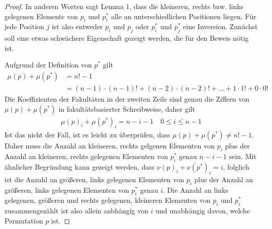 \documentclass[a4paper, 10pt, ngerman]{article}
\begin{document}
\begin{proof}
    In anderen Worten sagt Lemma 1, dass die kleineren, rechts bzw. links gelegenen Elemente von $p_i$ und $p^*_i$ alle an unterschiedlichen Positionen liegen. Für jede Position $j$ ist also entweder $p_i$ und $p_j$ oder $p^*_i$ und $p^*_j$ eine Inversion. Zunächst soll eine etwas schwächere Eigenschaft gezeigt werden, die für den Beweis nötig ist.

    Aufgrund der Definition von $p^*$ gilt
    \begin{align*}
        \mu(p) + \mu(p^*) & = n! - 1                                                                           \\
                          & =(n - 1) \cdot (n - 1)! + (n - 2) \cdot (n - 2)! + \dots + 1 \cdot 1! + 0 \cdot 0!
    \end{align*}
    Die Koeffizienten der Fakultäten in der zweiten Zeile sind genau die Ziffern von $\mu(p) + \mu(p^*)$ in fakultätsbasierter Schreibweise, daher gilt
    \begin{align*}
        \mu(p)_i + \mu(p^*)_i = n - i - 1 \quad 0 \le i \le n - 1
    \end{align*}
    Ist das nicht der Fall, ist es leicht zu überprüfen, dass $\mu(p) + \mu(p^*) \ne n! - 1$. Daher muss die Anzahl an kleineren, rechts gelgenen Elementen von $p_i$ plus der Anzahl an kleineren, rechts gelegenen Elementen von $p^*_i$ genau $n-i-1$ sein. Mit ähnlicher Begründung kann gezeigt werden, dass $\nu(p)_i + \nu(p^*)_i = i$, folglich ist die Anzahl an größeren, links gelegenen Elementen von $p_i$ plus der Anzahl an größeren, links gelegenen Elementen von $p^*_i$ genau $i$. Die Anzahl an links gelegenen, größeren und rechts gelegenen, kleineren Elementen von $p_i$ und $p^*_i$ zusammengezählt ist also allein anbhängig von $i$ und unabhängig davon, welche Permutation $p$ ist.


\end{proof}
\end{document}
